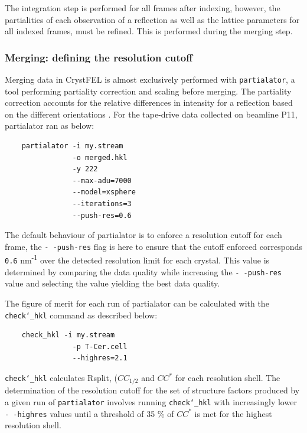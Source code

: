 The integration step is performed for all frames after indexing, however, the partialities of each observation of a reflection as well as the lattice parameters for all indexed frames, must be refined. This is performed during the merging step.

\subsubsection{Merging: defining the resolution cutoff}

Merging data in CrystFEL is almost exclusively performed with \texttt{partialator}, a tool performing partiality correction and scaling before merging. The partiality correction accounts for the relative differences in intensity for a reflection based on the different orientations \parencite{ginnRevisedPartialityModel2015}. For the tape-drive data collected on beamline P11, partialator ran as below:

\begin{verbatim}
    partialator -i my.stream
                -o merged.hkl 
                -y 222 
                --max-adu=7000  
                --model=xsphere 
                --iterations=3
                --push-res=0.6
\end{verbatim}

The default behaviour of partialator is to enforce a resolution cutoff for each frame, the \texttt{- -push-res} flag is here to ensure that the cutoff enforced corresponds \texttt{0.6} nm\textsuperscript{-1} over the detected resolution limit for each crystal. This value is determined by comparing the data quality while increasing the \texttt{- -push-res} value and selecting the value yielding the best data quality. 

The figure of merit for each run of partialator can be calculated with the \texttt{check\char`_hkl} command as described below:

\begin{verbatim}
    check_hkl -i my.stream 
                -p T-Cer.cell
                --highres=2.1
\end{verbatim}

\texttt{check\char`_hkl} calculates Rsplit, (\(CC_{1/2}\) and \(CC^\ast\) for each resolution shell. The determination of the resolution cutoff for the set of structure factors produced by a given run of \texttt{partialator} involves running \texttt{check\char`_hkl} with increasingly lower \texttt{- -highres} values until a threshold of 35 \% of \(CC^\ast\) is met for the highest resolution shell. 

